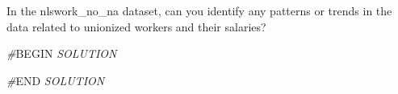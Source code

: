 \documentclass[
]{article}
\newenvironment{Shaded}{\begin{snugshade}}{\end{snugshade}}
\newcommand{\CommentTok}[1]{\textcolor[rgb]{0.56,0.35,0.01}{\textit{#1}}}
\newcommand{\RegionMarkerTok}[1]{#1}
\begin{document}
In the nlswork\_no\_na dataset, can you identify any patterns or trends
in the data related to unionized workers and their salaries?

\begin{Shaded}
\begin{Highlighting}[]
\CommentTok{\#}\RegionMarkerTok{BEGIN}\CommentTok{ SOLUTION}

\CommentTok{\#}\RegionMarkerTok{END}\CommentTok{ SOLUTION}
\end{Highlighting}
\end{Shaded}
\end{document}
